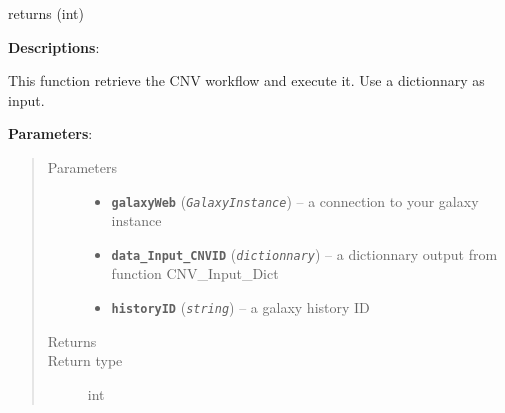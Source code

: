 \documentclass[letterpaper,10pt,english]{sphinxmanual}
\begin{document}
\begin{fulllineitems}
\label{datamanagerpkg:datamanagerpkg.GalaxyCommunication_data_manager.Run_CNV_Workflow}
returns (int)

\textbf{Descriptions}:

This function retrieve the CNV workflow and execute it. Use a dictionnary
as input.

\textbf{Parameters}:
\begin{quote}\begin{description}
\item[{Parameters}] \leavevmode\begin{itemize}
\item {} 
\textbf{\texttt{galaxyWeb}} (\emph{\texttt{GalaxyInstance}}) -- a connection to your galaxy instance

\item {} 
\textbf{\texttt{data\_Input\_CNVID}} (\emph{\texttt{dictionnary}}) -- a dictionnary output from function CNV\_Input\_Dict

\item {} 
\textbf{\texttt{historyID}} (\emph{\texttt{string}}) -- a galaxy history ID

\end{itemize}

\item[{Returns}] 

\item[{Return type}] \leavevmode
int

\end{description}\end{quote}

\end{fulllineitems}

\end{document}
